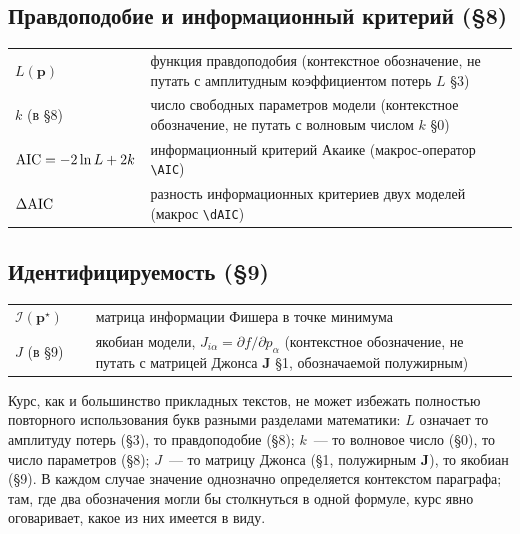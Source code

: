 \subsection*{Правдоподобие и информационный критерий (§8)}
\begin{center}
\footnotesize
\setlength{\tabcolsep}{6pt}
\begin{tabular}{@{}p{0.16\linewidth}p{0.84\linewidth}@{}}
\toprule
$L(\mathbf{p})$ & функция правдоподобия (контекстное обозначение, не путать с амплитудным
коэффициентом потерь $L$ §3) \\
$k$ (в §8) & число свободных параметров модели (контекстное обозначение, не путать с волновым
числом $k$ §0) \\
$\operatorname{AIC}=-2\ln L+2k$ & информационный критерий Акаике (макрос-оператор \texttt{\textbackslash AIC}) \\
$\Delta\mathrm{AIC}$ & разность информационных критериев двух моделей (макрос \texttt{\textbackslash dAIC}) \\
\bottomrule
\end{tabular}
\end{center}

\subsection*{Идентифицируемость (§9)}
\begin{center}
\footnotesize
\setlength{\tabcolsep}{6pt}
\begin{tabular}{@{}p{0.16\linewidth}p{0.84\linewidth}@{}}
\toprule
$\mathcal{I}(\mathbf{p}^\star)$ & матрица информации Фишера в точке минимума \\
$J$ (в §9) & якобиан модели, $J_{i\alpha}=\partial f/\partial p_\alpha$ (контекстное
обозначение, не путать с матрицей Джонса $\mathbf{J}$ §1, обозначаемой полужирным) \\
\bottomrule
\end{tabular}
\end{center}

\begin{warning}
Курс, как и большинство прикладных текстов, не может избежать полностью повторного использования
букв разными разделами математики: $L$ означает то амплитуду потерь (§3), то правдоподобие (§8);
$k$~--- то волновое число (§0), то число параметров (§8); $J$~--- то матрицу Джонса (§1, полужирным
$\mathbf{J}$), то якобиан (§9). В каждом случае значение однозначно определяется контекстом
параграфа; там, где два обозначения могли бы столкнуться в одной формуле, курс явно оговаривает,
какое из них имеется в виду.
\end{warning}

\clearpage

